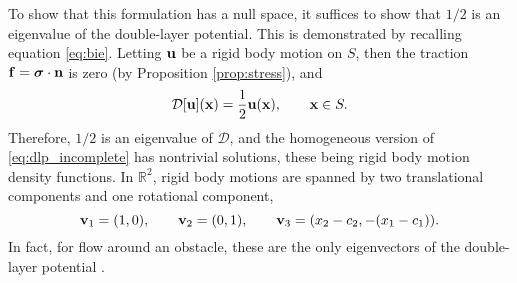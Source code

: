  To show that this formulation has a null space, it suffices to show that $1/2$ is an eigenvalue of the double-layer potential. This is demonstrated by recalling equation \eqref{eq:bie}. Letting ${\mathbf{u}}$ be a rigid body motion on $S$, then the traction ${\mathbf{f}} = \bm{\sigma}\cdot{\mathbf{n}}$ is zero (by Proposition \ref{prop:stress}), and
\[ \mathcal{D}[{\mathbf{u}}]({\mathbf{x}}) = \frac{1}{2}{\mathbf{u}}({\mathbf{x}}), \qquad {\mathbf{x}}\in S.\]
Therefore, $1/2$ is an eigenvalue of $\mathcal{D}$, and the homogeneous version of \eqref{eq:dlp_incomplete} has nontrivial solutions, these being rigid body motion density functions. In $\mathbb{R}^2$, rigid body motions are spanned by two translational components and one rotational component,
\[ {\mathbf{v}}_1 = ( 1, 0 ), \qquad {\mathbf{v}}_2 = ( 0, 1), \qquad {\mathbf{v}}_3 = ( x_2 - c_2, -(x_1 - c_1)).\]
 In fact, for flow around an obstacle, these are the only eigenvectors of the double-layer potential \cite{Ladyzhenskaya1963, Karrila1989, Karrila1991, Power1987}. 


